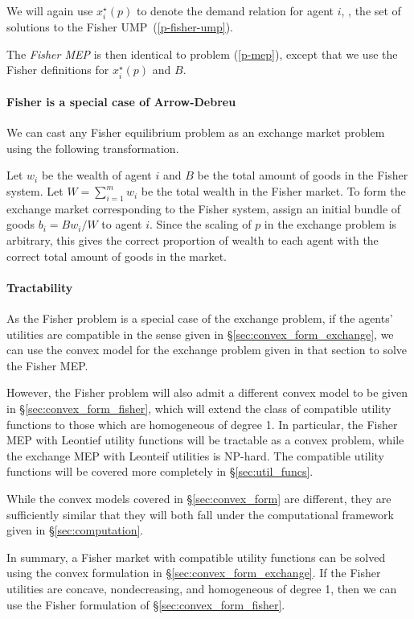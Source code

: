 \documentclass[12pt]{article}
\begin{document}
We will again use $x^\star_i(p)$ to denote the demand relation
for agent $i$, \ie, the set of solutions to the Fisher UMP~(\ref{p-fisher-ump}).

The \emph{Fisher MEP} is then identical to problem (\ref{p-mep}), except that we use 
the Fisher definitions for $x^\star_i(p)$ and $B$.


\paragraph{Fisher is a special case of Arrow-Debreu}
We can cast any Fisher equilibrium problem as an exchange market problem using the following transformation.

Let $w_i$ be the wealth of agent $i$ and $B$ be the total amount of goods in
the Fisher system.
Let $W = \sum_{i=1}^m w_i$ be the total wealth in the Fisher market.
To form the exchange market corresponding to the Fisher system, assign an initial bundle of goods
$b_i = B w_i/W$ to agent $i$.
Since the scaling of $p$ in the exchange problem is arbitrary,
this gives the correct proportion of wealth to each agent with the correct
total amount of goods in the market.


\paragraph{Tractability}
As the Fisher problem is a special case of the exchange problem,
if the agents' utilities are compatible in the sense given in \S\ref{sec:convex_form_exchange}, we can use the convex model for the
exchange problem given in that section to solve
the Fisher MEP.

However, the Fisher problem will also admit a different
convex model to be given in \S\ref{sec:convex_form_fisher},
which will extend the class of compatible utility functions
to those which are homogeneous of degree 1.
In particular, the Fisher MEP with Leontief utility functions
will be tractable as a convex problem, while the exchange MEP
with Leonteif utilities is NP-hard.
The compatible utility functions will be covered more completely
in \S\ref{sec:util_funcs}.

While the convex models covered in \S\ref{sec:convex_form} are different,
they are sufficiently similar that they will both fall under the computational
framework given in \S\ref{sec:computation}.

In summary, a Fisher market with compatible utility functions can be solved
using the convex formulation in \S\ref{sec:convex_form_exchange}.
If the Fisher utilities are concave, nondecreasing, and homogeneous
of degree 1, then we can use the Fisher formulation of \S\ref{sec:convex_form_fisher}.
\end{document}
